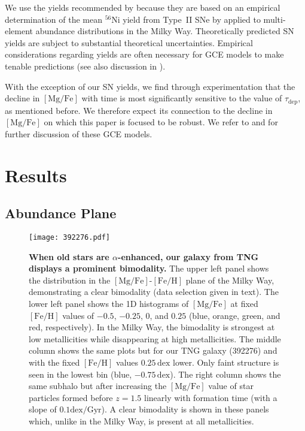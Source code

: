 \documentclass[twocolumn,linenumbers]{aastex631}
\newcommand{\Gyr}{\ensuremath{\textrm{Gyr}}}
\newcommand{\FeH}{\ensuremath{[\textrm{Fe}/\textrm{H}]}}
\newcommand{\MgFe}{\ensuremath{[\textrm{Mg}/\textrm{Fe}]}}
\newcommand{\dex}{\ensuremath{\textrm{dex}}}
\begin{document}
We use the yields recommended by \citet{2024ApJ...973..122W} because they are based on an empirical determination of the mean $^{56}$Ni yield from Type~II SNe by \citet{Rodriguez2021, Rodriguez2023} applied to multi-element abundance distributions in the Milky Way. Theoretically predicted SN yields \citep[e.g.][]{Seitenzahl2013, Sukhbold2016, Limongi2018, Gronow2021} are subject to substantial theoretical uncertainties. Empirical considerations regarding yields are often necessary for GCE models to make tenable predictions (see also discussion in \citealt{Palla2022}).

With the exception of our SN yields, we find through experimentation that the decline in \MgFe{} with time is most significantly sensitive to the value of $\tau_{\textrm{dep}}$, as mentioned before. We therefore expect its connection to the decline in \MgFe{} on which this paper is focused to be robust. We refer to \citet{2020MNRAS.498.1364J} and \citet{2022arXiv220402989C} for further discussion of these GCE models.

\section{Results}\label{sec:results}
\subsection{Abundance Plane}\label{ssec:plane}

\begin{figure*}
  \centering
  \texttt{[image: 392276.pdf]}
  \caption{\textbf{When old stars are $\alpha$-enhanced, our galaxy from TNG displays a prominent bimodality.} The upper left panel shows the distribution in the \MgFe{}-\FeH{} plane of the Milky Way, demonstrating a clear bimodality (data selection given in text). The lower left panel shows the 1D histograms of \MgFe{} at fixed \FeH{} values of $-0.5$, $-0.25$, $0$, and $0.25$ (blue, orange, green, and red, respectively). In the Milky Way, the bimodality is strongest at low metallicities while disappearing at high metallicities. The middle column shows the same plots but for our TNG galaxy (392276) and with the fixed \FeH{} values $0.25\,\dex$ lower. Only faint structure is seen in the lowest bin (blue, $-0.75\,\dex$). The right column shows the same subhalo but after increasing the \MgFe{} value of star particles formed before $z=1.5$ linearly with formation time (with a slope of $0.1\dex/\Gyr$). A clear bimodality is shown in these panels which, unlike in the Milky Way, is present at all metallicities.}
  \label{fig:fig1}
\end{figure*}
\end{document}
